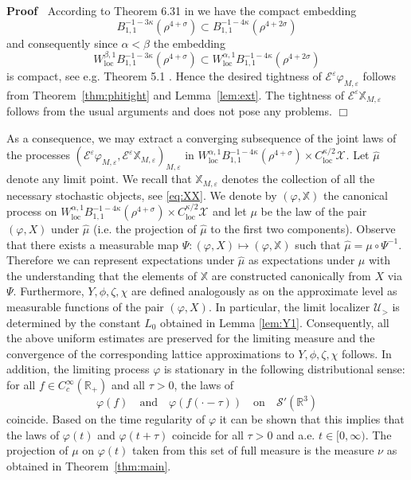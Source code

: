 \documentclass[a4paper,11pt]{article}
\newcommand{\tmop}[1]{\ensuremath{\operatorname{#1}}}
\newenvironment{proof}{\noindent\textbf{Proof\ }}{\hspace*{\fill}$\Box$\medskip}
\numberwithin{equation}{section}
\newcommand{\UU}{\mathscr{U}}
\begin{document}
\begin{proof}
  According to Theorem 6.31 in {\cite{T06}} we have the compact embedding
  \[ B_{1, 1}^{- 1 - 3 \kappa} (\rho^{4 + \sigma}) \subset B_{1, 1}^{- 1 - 4
     \kappa} (\rho^{4 + 2 \sigma}) \]
  and consequently since $\alpha < \beta$ the embedding
  \[ W^{\beta, 1}_{\tmop{loc}} B_{1, 1}^{- 1 - 3 \kappa} (\rho^{4 + \sigma})
     \subset W^{\alpha, 1}_{\tmop{loc}} B_{1, 1}^{- 1 - 4 \kappa} (\rho^{4 + 2
     \sigma}) \]
  is compact, see e.g. Theorem 5.1 {\cite{A00}}. Hence the desired tightness
  of $\mathcal{E}^{\varepsilon} \varphi_{M, \varepsilon}$ follows from Theorem~\ref{thm:phitight} and Lemma~\ref{lem:ext}. The tightness of
  $\mathcal{E}^{\varepsilon} \mathbb{X}_{M, \varepsilon}$ follows from the
  usual arguments and does not pose any problems.
\end{proof}

As a consequence, we may extract a converging subsequence of the joint laws of
the  processes $(\mathcal{E}^{\varepsilon} \varphi_{M, \varepsilon},
\mathcal{E}^{\varepsilon} \mathbb{X}_{M, \varepsilon})_{M, \varepsilon}$ in
$W^{\alpha, 1}_{\tmop{loc}} B_{1, 1}^{- 1 - 4 \kappa} (\rho^{4 + \sigma})
\times C^{\kappa / 2}_{\tmop{loc}} \mathcal{X}^{}$. Let $\hat{\mu}$ denote any
limit point. We recall that $\mathbb{X}_{M,\varepsilon}$ denotes the collection of all the necessary stochastic objects, see \eqref{eq:XX}. We denote by $(\varphi, \mathbb{X})$ the canonical process on
$W^{\alpha, 1}_{\tmop{loc}} B_{1, 1}^{- 1 - 4 \kappa} (\rho^{4 + \sigma})
\times C^{\kappa / 2}_{\tmop{loc}} \mathcal{X}^{}$  and let $\mu$ be the law
of the pair $(\varphi, X)$ under $\hat{\mu}$ (i.e. the projection of $\hat{\mu}$
to the first two components). Observe that there exists a measurable map $\Psi :
(\varphi, X) \mapsto (\varphi, \mathbb{X})$ such that $\hat{\mu} = \mu \circ
\Psi^{- 1}$. Therefore we can represent expectations under $\hat{\mu}$ as
expectations under $\mu$ with the understanding that the elements of
$\mathbb{X}$ are constructed canonically from $X$ via $\Psi$. Furthermore, $Y,\phi,\zeta,\chi$ are defined analogously as on the approximate level as measurable functions of the pair $(\varphi,X)$. In particular, the limit localizer $\UU_{>}$ is determined by the constant $L_{0}$ obtained in Lemma \ref{lem:Y1}. Consequently, all the above uniform estimates are preserved for the limiting measure and the convergence of the corresponding lattice approximations to $Y,\phi,\zeta,\chi$ follows. In addition, the limiting process $\varphi$ is stationary in the following distributional sense: for all $f\in C^{\infty}_{c}(\mathbb{R}_{+})$ and all $\tau>0$, the laws of
$$
\varphi(f)\quad\text{and}\quad \varphi(f(\cdot-\tau))\quad\text{on}\quad \mathcal{S}'(\mathbb{R}^{3})
$$
coincide. Based on the time regularity of $\varphi$ it can be shown that this implies that the laws of $\varphi(t)$ and $\varphi(t+\tau)$ coincide for all $\tau>0$ and a.e. $t\in[0,\infty)$. The projection of $\mu$ on $\varphi(t)$ taken from this set of full measure is the measure $\nu$ as obtained in Theorem~\ref{thm:main}.
\end{document}
